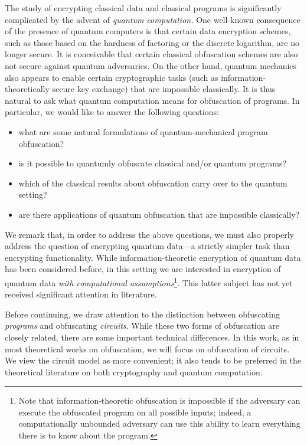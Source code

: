 \documentclass[envcountsame]{llncs}
\numberwithin{equation}{section}
\begin{document}
The study of encrypting classical data and classical programs is significantly complicated by the advent of \emph{quantum computation.} One well-known consequence of the presence of quantum computers is that certain data encryption schemes, such as those based on the hardness of factoring or the discrete logarithm, are no longer secure. It is conceivable that certain classical obfuscation schemes are also not secure against quantum adversaries. On the other hand, quantum mechanics also appears to enable certain cryptographic tasks (such as information-theoretically secure key exchange) that are impossible classically. It is thus natural to ask what quantum computation means for obfuscation of programs. In particular, we would like to answer the following questions:

\begin{itemize}
\item what are some natural formulations of quantum-mechanical program obfuscation?
\item is it possible to quantumly obfuscate classical and/or quantum programs?
\item which of the classical results about obfuscation carry over to the quantum setting?
\item are there applications of quantum obfuscation that are impossible classically?
\end{itemize}

We remark that, in order to address the above questions, we must also properly address the question of encrypting quantum data---a strictly simpler task than encrypting functionality. While information-theoretic encryption of quantum data has been considered before, in this setting we are interested in encryption of quantum data \emph{with computational assumptions}\footnote{Note that information-theoretic obfuscation is impossible if the adversary can execute the obfuscated program on all possible inputs; indeed, a computationally unbounded adversary can use this ability to learn everything there is to know about the program.}. This latter subject has not yet received significant attention in literature.

Before continuing, we draw attention to the distinction between obfuscating \emph{programs} and obfuscating \emph{circuits}. While these two forms of obfuscation are closely related, there are some important technical differences. In this work, as in most theoretical works on obfuscation, we will focus on obfuscation of circuits. We view the circuit model as more convenient; it also tends to be preferred in the theoretical literature on both cryptography and quantum computation.
\end{document}
